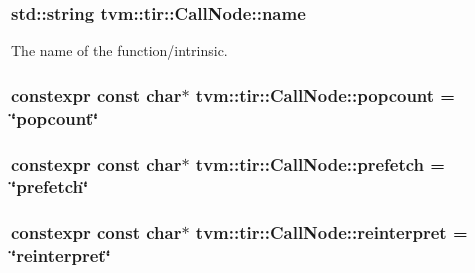 \subsubsection[{\texorpdfstring{name}{name}}]{\setlength{\rightskip}{0pt plus 5cm}std\+::string tvm\+::tir\+::\+Call\+Node\+::name}\hypertarget{classtvm_1_1tir_1_1CallNode_a3bd9e0b7cdea76a46815d6c175f682e0}{}\label{classtvm_1_1tir_1_1CallNode_a3bd9e0b7cdea76a46815d6c175f682e0}


The name of the function/intrinsic. 

\subsubsection[{\texorpdfstring{popcount}{popcount}}]{\setlength{\rightskip}{0pt plus 5cm}constexpr const char$\ast$ tvm\+::tir\+::\+Call\+Node\+::popcount = \char`\"{}popcount\char`\"{}\hspace{0.3cm}{\ttfamily [static]}}\hypertarget{classtvm_1_1tir_1_1CallNode_a2fbfd414c61e8d2cf749882789625f16}{}\label{classtvm_1_1tir_1_1CallNode_a2fbfd414c61e8d2cf749882789625f16}
\subsubsection[{\texorpdfstring{prefetch}{prefetch}}]{\setlength{\rightskip}{0pt plus 5cm}constexpr const char$\ast$ tvm\+::tir\+::\+Call\+Node\+::prefetch = \char`\"{}prefetch\char`\"{}\hspace{0.3cm}{\ttfamily [static]}}\hypertarget{classtvm_1_1tir_1_1CallNode_a747a64efc4f4a67067486f047de1c51a}{}\label{classtvm_1_1tir_1_1CallNode_a747a64efc4f4a67067486f047de1c51a}
\subsubsection[{\texorpdfstring{reinterpret}{reinterpret}}]{\setlength{\rightskip}{0pt plus 5cm}constexpr const char$\ast$ tvm\+::tir\+::\+Call\+Node\+::reinterpret = \char`\"{}reinterpret\char`\"{}\hspace{0.3cm}{\ttfamily [static]}}\hypertarget{classtvm_1_1tir_1_1CallNode_afd029e12c4b28b7d6fea4a8bf27c6e50}{}\label{classtvm_1_1tir_1_1CallNode_afd029e12c4b28b7d6fea4a8bf27c6e50}
